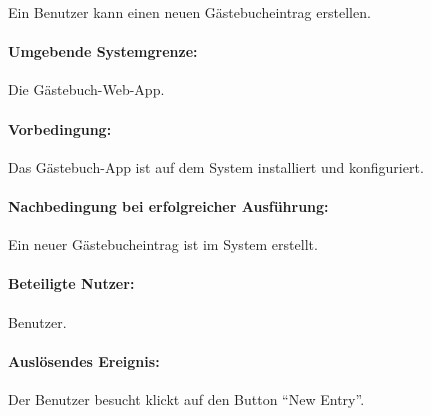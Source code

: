 \begin{asparaitem}
\item Ein Benutzer kann einen neuen Gästebucheintrag erstellen.
\end{asparaitem}

\paragraph{Umgebende Systemgrenze:}

Die Gästebuch-Web-App.

\paragraph{Vorbedingung:}

Das Gästebuch-App ist auf dem System installiert und konfiguriert.

\paragraph{Nachbedingung bei erfolgreicher Ausführung:}

\begin{asparaitem}
\item Ein neuer Gästebucheintrag ist im System erstellt.
\end{asparaitem}

\paragraph{Beteiligte Nutzer:}

\begin{asparaitem}
\item Benutzer.
\end{asparaitem}

\paragraph{Auslösendes Ereignis:}

\begin{asparaitem}
\item Der Benutzer besucht klickt auf den Button ``New Entry''.
\end{asparaitem}

